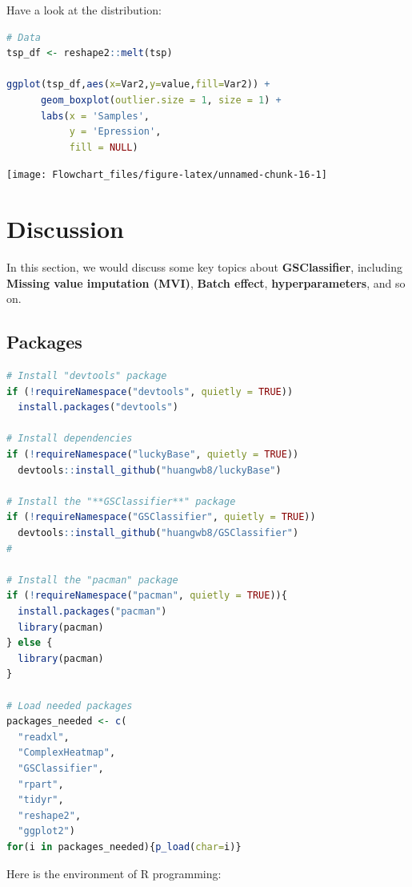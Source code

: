 \documentclass[
  12pt,
]{book}
\begin{document}
Have a look at the distribution:

\begin{lstlisting}[language=R]
# Data
tsp_df <- reshape2::melt(tsp)

ggplot(tsp_df,aes(x=Var2,y=value,fill=Var2)) + 
      geom_boxplot(outlier.size = 1, size = 1) + 
      labs(x = 'Samples',
           y = 'Epression',
           fill = NULL) 
\end{lstlisting}

\begin{center}\texttt{[image: Flowchart\_files/figure-latex/unnamed-chunk-16-1]} \end{center}

\hypertarget{discussion}{%
\chapter{Discussion}\label{discussion}}

In this section, we would discuss some key topics about \textbf{GSClassifier}, including \textbf{Missing value imputation (MVI)}, \textbf{Batch effect}, \textbf{hyperparameters}, and so on.

\hypertarget{packages-1}{%
\section{Packages}\label{packages-1}}

\begin{lstlisting}[language=R]
# Install "devtools" package
if (!requireNamespace("devtools", quietly = TRUE))
  install.packages("devtools")

# Install dependencies
if (!requireNamespace("luckyBase", quietly = TRUE))
  devtools::install_github("huangwb8/luckyBase")

# Install the "**GSClassifier**" package
if (!requireNamespace("GSClassifier", quietly = TRUE))
  devtools::install_github("huangwb8/GSClassifier")
# 

# Install the "pacman" package
if (!requireNamespace("pacman", quietly = TRUE)){
  install.packages("pacman")
  library(pacman)
} else {
  library(pacman)
}

# Load needed packages
packages_needed <- c(
  "readxl",
  "ComplexHeatmap",
  "GSClassifier",
  "rpart",
  "tidyr",
  "reshape2",
  "ggplot2")
for(i in packages_needed){p_load(char=i)}
\end{lstlisting}

Here is the environment of R programming:
\end{document}
